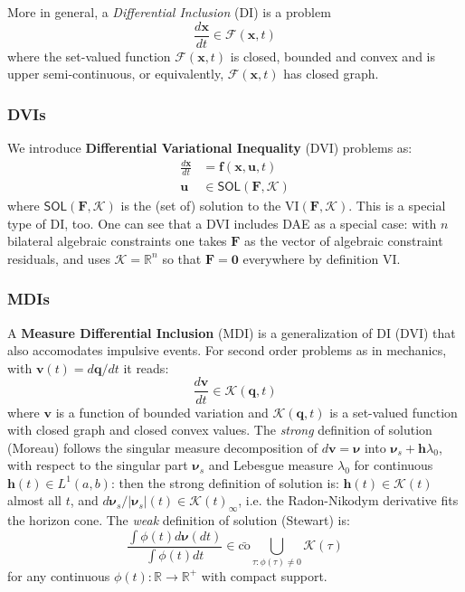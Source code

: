 \documentclass{digitaldynamics}
\def\vect#1{\bm{#1}}
\begin{document}
More in general, a \textit{Differential Inclusion} (DI) is a problem
\begin{equation}
\label{eq:DI}
\frac{d\vect{x}}{dt} \in \mathcal{F}(\vect{x},t) 
\end{equation}
where the set-valued function $\mathcal{F}(\vect{x},t)$ is
closed, bounded and convex and is upper semi-continuous, or
equivalently, $\mathcal{F}(\vect{x},t)$ has closed graph.


\subsubsection{DVIs}

We introduce \textbf{Differential Variational Inequality} (DVI) problems as:
\begin{subequations}
\label{eq:DVI}
\begin{align}
\frac{d\vect{x}}{dt} &= \vect{f}(\vect{x},\vect{u},t)  \\
\vect{u} &\in \mathsf{SOL}(\vect{F},\mathcal{K})
\end{align}
\end{subequations}
where $\mathsf{SOL}(\vect{F},\mathcal{K})$ is the (set of) solution 
to the VI$(\vect{F},\mathcal{K})$.
This is a special type of DI, too.
One can see that a DVI includes DAE as a special case: with $n$ bilateral
algebraic constraints one takes $\vect{F}$ as the vector of algebraic constraint residuals,
and uses $\mathcal{K}=\mathbb{R}^n$ so that $\vect{F}=\vect{0}$ everywhere by definition VI.


\subsubsection{MDIs}

A \textbf{Measure Differential Inclusion} (MDI) is a
generalization of DI (DVI) that also accomodates impulsive events. 
For second order problems as in mechanics, with 
$\vect{v}(t)=d\vect{q}/dt$
it reads:
\begin{equation}
\label{eq:MDI}
\frac{d\vect{v}}{dt} \in \mathcal{K}(\vect{q},t) 
\end{equation}
where $\vect{v}$ is a function of bounded variation and
$\mathcal{K}(\vect{q},t)$ is a set-valued function with
closed graph and closed convex values. 
The \textit{strong} definition of solution (Moreau) follows the singular
measure decomposition of $d\vect{v}=\vect{\nu}$ into 
$\vect{\nu}_s+\vect{h}\lambda_0$,
with respect to the singular part $\vect{\nu}_s$ 
and Lebesgue measure
$\lambda_0$ for continuous $\vect{h}(t) \in L^1(a,b)$: then the strong definition of solution is: 
$\vect{h}(t) \in \mathcal{K}(t)$ almost all $t$, and 
$d\vect{\nu}_s/|\vect{\nu}_s|(t) \in \mathcal{K}(t)_\infty$, 
i.e. the Radon-Nikodym derivative fits the horizon cone.
The \textit{weak} definition of solution (Stewart) is:
\begin{equation}
\label{eq:MDI_weak}
\frac{\int \phi(t) d\vect{\nu}(dt)}{ \int \phi(t) dt} 
 \in \bar{\mathrm{co}} \bigcup_{\tau:\phi(\tau)\neq 0} \mathcal{K}(\tau) 
\end{equation}
for any continuous $\phi(t):\mathbb{R}\rightarrow\mathbb{R}^+$ with compact support.
\end{document}
